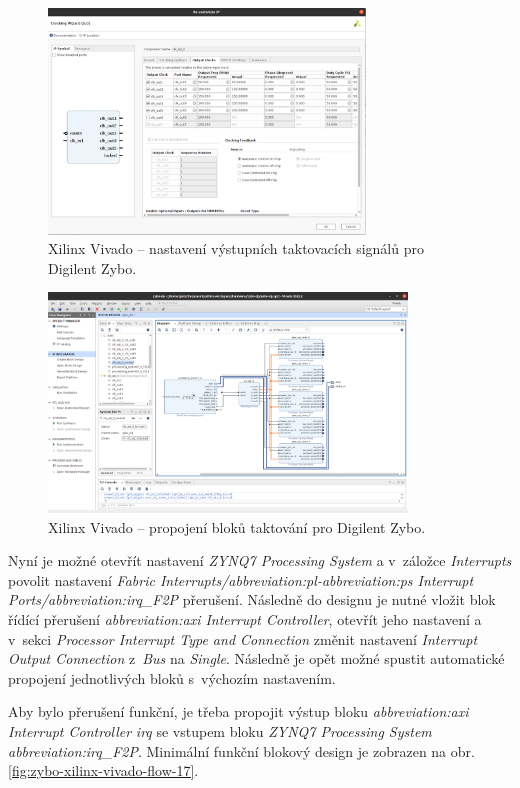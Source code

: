 \documentclass[a4paper, twoside, 11pt]{article}
\newcommand{\fbar}{\FloatBarrier}
\begin{document}
\begin{appendices}
		\begin{figure}[htbp!]
			\centering
			\includegraphics[width=0.75\textwidth]{src/png/zybo-xilinx-vivado-flow/zybo-xilinx-vivado-flow-36.jpg}
			\caption{Xilinx Vivado – nastavení výstupních taktovacích signálů pro Digilent Zybo.}
			\label{fig:zybo-xilinx-vivado-flow-36}
		\end{figure}

		\begin{figure}[htbp!]
			\centering
			\includegraphics[width=0.85\textwidth]{src/png/zybo-xilinx-vivado-flow/zybo-xilinx-vivado-flow-12.jpg}
			\caption{Xilinx Vivado – propojení bloků taktování pro Digilent Zybo.}
			\label{fig:zybo-xilinx-vivado-flow-12}
		\end{figure}

		\fbar

		Nyní je možné otevřít nastavení \textit{ZYNQ7 Processing System} a v~záložce \textit{Interrupts} povolit nastavení \textit{Fabric Interrupts/\gls{abbreviation:pl}-\gls{abbreviation:ps} Interrupt Ports/\gls{abbreviation:irq}\_F2P} přerušení. Následně do designu je nutné vložit blok řídící přerušení \textit{\gls{abbreviation:axi} Interrupt Controller}, otevřít jeho nastavení a v~sekci \textit{Processor Interrupt Type and Connection} změnit nastavení \textit{Interrupt Output Connection} z~\textit{Bus} na \textit{Single}. Následně je opět možné spustit automatické propojení jednotlivých bloků s~výchozím nastavením.\par
		Aby bylo přerušení funkční, je třeba propojit výstup bloku \textit{\gls{abbreviation:axi} Interrupt Controller} \textit{irq} se vstupem bloku \textit{ZYNQ7 Processing System} \textit{\gls{abbreviation:irq}\_F2P}. Minimální funkční blokový design je zobrazen na obr. \ref{fig:zybo-xilinx-vivado-flow-17}.


\end{appendices}
\end{document}
